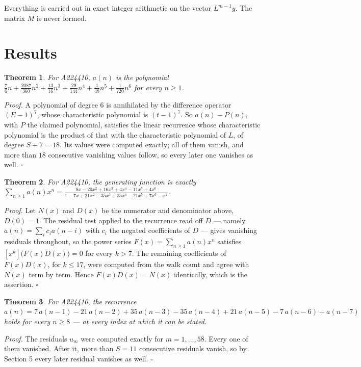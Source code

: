 \documentclass[11pt]{article}
\newtheorem{theorem}{Theorem}
\theoremstyle{definition}
\begin{document}
Everything is carried out in exact integer arithmetic on the vector $L^{m-1}y$. The matrix $M$ is never formed.

\section{Results}

\begin{theorem} For A224410, $a(n)$ is the polynomial $\frac{7}{6}n + \frac{2087}{360}n^{2} + \frac{13}{16}n^{3} + \frac{29}{144}n^{4} + \frac{1}{48}n^{5} + \frac{1}{720}n^{6}$ for every $n \ge 1$.\end{theorem}

{\itshape Proof.} A polynomial of degree $6$ is annihilated by the difference operator $(E-1)^{7}$, whose characteristic polynomial is $(t-1)^{7}$. So $a(n) - P(n)$, with $P$ the claimed polynomial, satisfies the linear recurrence whose characteristic polynomial is the product of that with the characteristic polynomial of $L$, of degree $S + 7 = 18$. Its values were computed exactly; all of them vanish, and more than $18$ consecutive vanishing values follow, so every later one vanishes as well. $\square$

\begin{theorem} For A224410, the generating function is exactly $\sum_{n\ge 1} a(n)x^n = \frac{8x - 20x^{2} + 16x^{3} + 4x^{4} - 11x^{5} + 4x^{6}}{1 - 7x + 21x^{2} - 35x^{3} + 35x^{4} - 21x^{5} + 7x^{6} - x^{7}}$.\end{theorem}

{\itshape Proof.} Let $N(x)$ and $D(x)$ be the numerator and denominator above, $D(0)=1$. The residual test applied to the recurrence read off $D$ --- namely $a(n) = \sum_i c_i a(n-i)$ with $c_i$ the negated coefficients of $D$ --- gives vanishing residuals throughout, so the power series $F(x)=\sum_{n\ge 1}a(n)x^n$ satisfies $[x^k]\bigl(F(x)D(x)\bigr) = 0$ for every $k > 7$. The remaining coefficients of $F(x)D(x)$, for $k \le 17$, were computed from the walk count and agree with $N(x)$ term by term. Hence $F(x)D(x) = N(x)$ identically, which is the assertion. $\square$

\begin{theorem} For A224410, the recurrence $a(n) = 7\,a(n-1) - 21\,a(n-2) + 35\,a(n-3) - 35\,a(n-4) + 21\,a(n-5) - 7\,a(n-6) + a(n-7)$ holds for every $n \ge 8$ --- at every index at which it can be stated.\end{theorem}

{\itshape Proof.} The residuals $u_m$ were computed exactly for $m = 1,\dots,58$. Every one of them vanished. After it, more than $S = 11$ consecutive residuals vanish, so by Section 5 every later residual vanishes as well. $\square$
\end{document}
